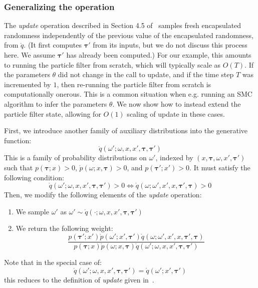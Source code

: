 \documentclass[11pt]{article}
\newcommand\tdict[0]{\boldsymbol{\tau}}
\begin{document}
\subsubsection{Generalizing the operation}
The \emph{update} operation described in Section 4.5 of~\citet{cusumano-towner-thesis} samples fresh encapsulated randomness independently of the previous value of the encapsulated randomness, from $\mathring{q}$.
(It first computes $\tdict'$ from its inputs, but we do not discuss this process here. We assume $\tdict'$ has already been computed.)
For our example, this amounts to running the particle filter from scratch, which will typically scale as $O(T)$.
If the parameters $\theta$ did not change in the call to update, and if the time step $T$ was incremented by $1$, then re-running the particle filter from scratch is computationally onerous.
This is a common situation when e.g. running an SMC algorithm to infer the parameters $\theta$.
We now show how to instead extend the particle filter state, allowing for $O(1)$ scaling of update in these cases.

First, we introduce another family of auxiliary distributions into the generative function:
\[
\mathring{q}(\omega'; \omega, x, x', \tdict, \tdict')
\]
This is a family of probability distributions on $\omega'$, indexed by $(x, \tdict, \omega, x', \tdict')$ such that $p(\tdict; x) > 0$, $\mathring{p}(\omega; x, \tdict) > 0$, and $p(\tdict'; x') > 0$.
It must satisfy the following condition:
\[
\mathring{q}(\omega'; \omega, x, x', \tdict, \tdict') > 0 \iff \mathring{q}(\omega; \omega', x', x, \tdict', \tdict) > 0
\]
Then, we modify the following elements of the \emph{update} operation:
\begin{enumerate}
\item We sample $\omega'$ as $\omega' \sim \mathring{q}(\cdot; \omega, x, x', \tdict, \tdict')$
\item We return the following weight:
\[
\frac{p(\tdict'; x') \mathring{p}(\omega'; x', \tdict')\mathring{q}(\omega; \omega', x', x, \tdict', \tdict)}
{p(\tdict; x) \mathring{p}(\omega; x, \tdict) \mathring{q}(\omega'; \omega, x, x', \tdict, \tdict')}
\]
\end{enumerate}
Note that in the special case of:
\[
\mathring{q}(\omega'; \omega, x, x', \tdict, \tdict') = \mathring{q}(\omega'; x', \tdict')
\]
this reduces to the definition of \emph{update} given in~\citet{cusumano-towner-thesis}.
\end{document}
